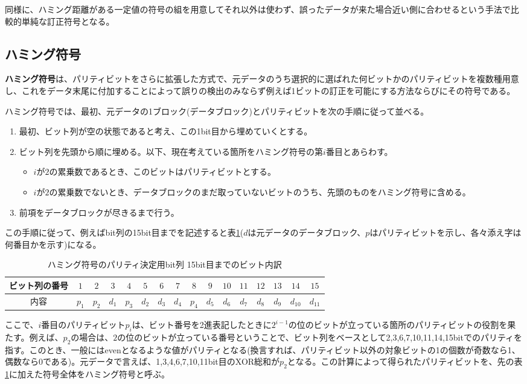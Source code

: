 同様に、ハミング距離がある一定値の符号の組を用意してそれ以外は使わず、誤ったデータが来た場合近い側に合わせるという手法で比較的単純な訂正符号となる。

\subsection{ハミング符号}
\textbf{ハミング符号}は、パリティビットをさらに拡張した方式で、元データのうち選択的に選ばれた何ビットかのパリティビットを複数種用意し、これをデータ末尾に付加することによって誤りの検出のみならず例えば1ビットの訂正を可能にする方法ならびにその符号である。

ハミング符号では、最初、元データの1ブロック(データブロック)とパリティビットを次の手順に従って並べる。
\begin{enumerate}
\item 最初、ビット列が空の状態であると考え、この1bit目から埋めていくとする。
\item ビット列を先頭から順に埋める。以下、現在考えている箇所をハミング符号の第$i$番目とあらわす。
  \begin{itemize}
  \item $i$が$2$の累乗数であるとき、このビットはパリティビットとする。
  \item $i$が$2$の累乗数でないとき、データブロックのまだ取っていないビットのうち、先頭のものをハミング符号に含める。
  \end{itemize}
\item 前項をデータブロックが尽きるまで行う。
\end{enumerate}

この手順に従って、例えばbit列の15bit目までを記述すると表\ref{table7_1}($d$は元データのデータブロック、$p$はパリティビットを示し、各々添え字は何番目かを示す)になる。
\begin{table}[htb]
\centering
\caption{ハミング符号のパリティ決定用bit列 15bit目までのビット内訳}\label{table7_1}
\begin{tabular}{|c||c|c|c|c|c|c|c|c|c|c|c|c|c|c|c|}\hline
ビット列の番号&$1$&$2$&$3$&$4$&$5$&$6$&$7$&$8$&$9$&$10$&$11$&$12$&$13$&$14$&$15$\\ \hline
内容&$p_1$&$p_2$&$d_1$&$p_3$&$d_2$&$d_3$&$d_4$&$p_4$&$d_5$&$d_6$&$d_7$&$d_8$&$d_9$&$d_{10}$&$d_{11}$\\ \hline
\end{tabular}
\end{table}

ここで、$i$番目のパリティビット$p_i$は、ビット番号を2進表記したときに$2^{i-1}$の位のビットが立っている箇所のパリティビットの役割を果たす。例えば、$p_2$の場合は、$2$の位のビットが立っている番号ということで、ビット列をベースとして2,3,6,7,10,11,14,15bitでのパリティを指す。このとき、一般にはevenとなるような値がパリティとなる(換言すれば、パリティビット以外の対象ビットの1の個数が奇数なら1、偶数なら0である)。元データで言えば、1,3,4,6,7,10,11bit目のXOR総和が$p_2$となる。この計算によって得られたパリティビットを、先の表\ref{table7_1}に加えた符号全体をハミング符号と呼ぶ。

